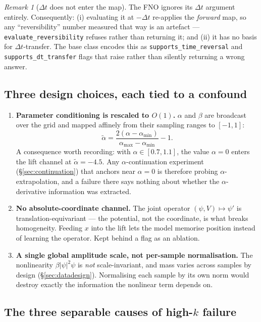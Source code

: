 \documentclass[11pt,a4paper]{article}
\theoremstyle{plain}
\theoremstyle{definition}
\theoremstyle{remark}
\newtheorem{remark}[theorem]{Remark}
\newcommand{\dt}{\Delta t}
\newcommand{\code}[1]{\texttt{\small #1}}
\begin{document}
\begin{remark}[$\dt$ does not enter the map]
\label{rem:fnodt}
The FNO ignores its $\dt$ argument entirely. Consequently:
(i) evaluating it at $-\dt$ re-applies the \emph{forward} map, so any ``reversibility''
number measured that way is an artefact --- \code{evaluate\_reversibility} refuses rather
than returning it; and (ii) it has no basis for $\dt$-transfer. The base class
encodes this as \code{supports\_time\_reversal} and \code{supports\_dt\_transfer} flags
that raise rather than silently returning a wrong answer.
\end{remark}

\subsection{Three design choices, each tied to a confound}

\begin{enumerate}[leftmargin=1.4em,itemsep=0.35em]
\item \textbf{Parameter conditioning is rescaled to $O(1)$.} $\alpha$ and $\beta$ are
broadcast over the grid and mapped affinely from their sampling ranges to $[-1,1]$:
\[
\tilde\alpha = \frac{2(\alpha-\alpha_{\min})}{\alpha_{\max}-\alpha_{\min}} - 1 .
\]
A consequence worth recording: with $\alpha\in[0.7,1.1]$, the value $\alpha=0$ enters the
lift channel at $\tilde\alpha = -4.5$. Any $\alpha$-continuation experiment
(\S\ref{sec:continuation}) that anchors near $\alpha=0$ is therefore probing
$\alpha$-extrapolation, and a failure there says nothing about whether the
$\alpha$-derivative information was extracted.

\item \textbf{No absolute-coordinate channel.} The joint operator $(\psi,V)\mapsto\psi'$
is translation-equivariant --- the potential, not the coordinate, is what breaks
homogeneity. Feeding $x$ into the lift lets the model memorise position instead of
learning the operator. Kept behind a flag as an ablation.

\item \textbf{A single global amplitude scale, not per-sample normalisation.} The
nonlinearity $\beta|\psi|^2\psi$ is \emph{not} scale-invariant, and mass varies across
samples by design (\S\ref{sec:datadesign}). Normalising each sample by its own norm would
destroy exactly the information the nonlinear term depends on.
\end{enumerate}

\subsection{The three separable causes of high-$k$ failure}
\label{sec:highk}
\end{document}
